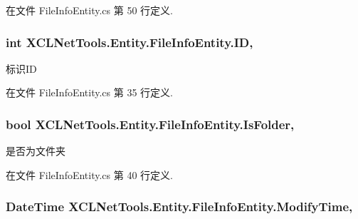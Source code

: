 在文件 File\-Info\-Entity.\-cs 第 50 行定义.

\hypertarget{class_x_c_l_net_tools_1_1_entity_1_1_file_info_entity_a150f26081f12badeea9a2255bbea6faf}{
\subsubsection[{I\-D}]{\setlength{\rightskip}{0pt plus 5cm}int X\-C\-L\-Net\-Tools.\-Entity.\-File\-Info\-Entity.\-I\-D\hspace{0.3cm}{\ttfamily [get]}, {\ttfamily [set]}}}\label{class_x_c_l_net_tools_1_1_entity_1_1_file_info_entity_a150f26081f12badeea9a2255bbea6faf}


标识\-I\-D 



在文件 File\-Info\-Entity.\-cs 第 35 行定义.

\hypertarget{class_x_c_l_net_tools_1_1_entity_1_1_file_info_entity_ad945716535742c01f83dffc2766c0987}{
\subsubsection[{Is\-Folder}]{\setlength{\rightskip}{0pt plus 5cm}bool X\-C\-L\-Net\-Tools.\-Entity.\-File\-Info\-Entity.\-Is\-Folder\hspace{0.3cm}{\ttfamily [get]}, {\ttfamily [set]}}}\label{class_x_c_l_net_tools_1_1_entity_1_1_file_info_entity_ad945716535742c01f83dffc2766c0987}


是否为文件夹 



在文件 File\-Info\-Entity.\-cs 第 40 行定义.

\hypertarget{class_x_c_l_net_tools_1_1_entity_1_1_file_info_entity_a64c6633bec7e4d547632c122dbaad9f8}{
\subsubsection[{Modify\-Time}]{\setlength{\rightskip}{0pt plus 5cm}Date\-Time X\-C\-L\-Net\-Tools.\-Entity.\-File\-Info\-Entity.\-Modify\-Time\hspace{0.3cm}{\ttfamily [get]}, {\ttfamily [set]}}}\label{class_x_c_l_net_tools_1_1_entity_1_1_file_info_entity_a64c6633bec7e4d547632c122dbaad9f8}


